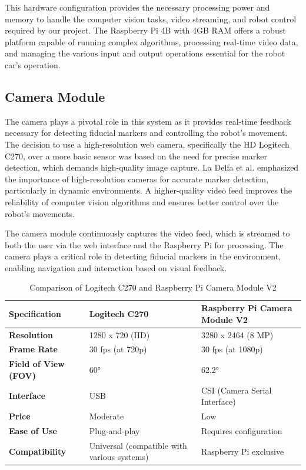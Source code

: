 This hardware configuration provides the necessary processing power and memory to handle the computer vision tasks, video streaming, and robot control required by our project. The Raspberry Pi 4B with 4GB RAM offers a robust platform capable of running complex algorithms, processing real-time video data, and managing the various input and output operations essential for the robot car's operation.

\subsection{Camera Module}
The camera plays a pivotal role in this system as it provides real-time feedback necessary for detecting fiducial markers and controlling the robot's movement. The decision to use a high-resolution web camera, specifically the HD Logitech C270, over a more basic sensor was based on the need for precise marker detection, which demands high-quality image capture. La Delfa et al. \cite{delfa2015} emphasized the importance of high-resolution cameras for accurate marker detection, particularly in dynamic environments. A higher-quality video feed improves the reliability of computer vision algorithms and ensures better control over the robot’s movements.

The camera module continuously captures the video feed, which is streamed to both the user via the web interface and the Raspberry Pi for processing. The camera plays a critical role in detecting fiducial markers in the environment, enabling navigation and interaction based on visual feedback.

\begin{table}[h!]
	\centering
	\caption{Comparison of Logitech C270 and Raspberry Pi Camera Module V2}
	\begin{tabular}{|p{4cm}|p{5cm}|p{5cm}|}
		\hline
		\textbf{Specification}        & \textbf{Logitech C270}            & \textbf{Raspberry Pi Camera Module V2} \\ \hline
		\textbf{Resolution}           & 1280 x 720 (HD)                   & 3280 x 2464 (8 MP)                      \\ \hline
		\textbf{Frame Rate}           & 30 fps (at 720p)                  & 30 fps (at 1080p)                       \\ \hline
		\textbf{Field of View (FOV)}  & 60°                               & 62.2°                                   \\ \hline
		\textbf{Interface}            & USB                               & CSI (Camera Serial Interface)           \\ \hline
		\textbf{Price}                & Moderate                          & Low                                     \\ \hline
		\textbf{Ease of Use}          & Plug-and-play                     & Requires configuration                  \\ \hline
		\textbf{Compatibility}        & Universal (compatible with various systems) & Raspberry Pi exclusive                 \\ \hline
	\end{tabular}
	\label{tab:camera_comparison}
\end{table}


